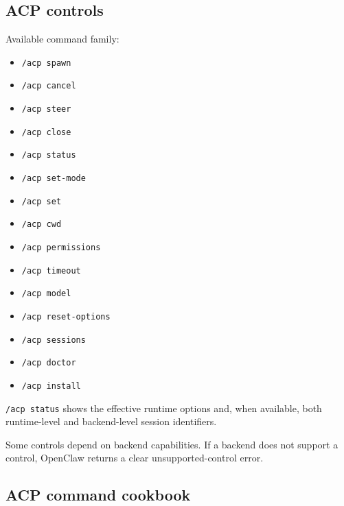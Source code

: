 \subsection{ACP controls}


Available command family:

\begin{itemize}
  \item \texttt{/acp spawn}
  \item \texttt{/acp cancel}
  \item \texttt{/acp steer}
  \item \texttt{/acp close}
  \item \texttt{/acp status}
  \item \texttt{/acp set-mode}
  \item \texttt{/acp set}
  \item \texttt{/acp cwd}
  \item \texttt{/acp permissions}
  \item \texttt{/acp timeout}
  \item \texttt{/acp model}
  \item \texttt{/acp reset-options}
  \item \texttt{/acp sessions}
  \item \texttt{/acp doctor}
  \item \texttt{/acp install}
\end{itemize}


\texttt{/acp status} shows the effective runtime options and, when available, both runtime-level and backend-level session identifiers.

Some controls depend on backend capabilities. If a backend does not support a control, OpenClaw returns a clear unsupported-control error.

\subsection{ACP command cookbook}




